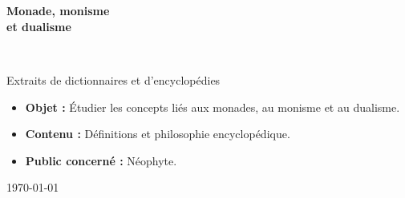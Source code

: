 \begin{titlepage}
%
~\\[1cm]

\begin{center}
\end{center}

\textsc{\Large }\\[0.5cm]

\HRule

\begin{center}
{\huge \bfseries  Monade, monisme\\
et dualisme\\[0.4cm] }
\end{center}

\HRule \\[1.5cm]


\vfill

\hfill
\begin{minipage}{0.4\textwidth}
\begin{flushright} \large
Extraits de dictionnaires et d'encyclopédies
\end{flushright}
\end{minipage}

\vfill
{\sf \footnotesize
\begin{itemize}[leftmargin=1cm, label=, itemsep=1pt]
\item {\bf Objet : } Étudier les concepts liés aux monades, au monisme et au dualisme.
\item {\bf Contenu : } Définitions et philosophie encyclopédique.
\item {\bf Public concerné : } Néophyte.
\end{itemize}
}

\vfill

{\large \today}

\end{titlepage}
